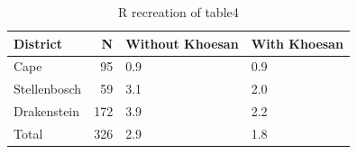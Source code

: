 \begin{table}

\caption{R recreation of table4}
\centering
\begin{tabular}[t]{lrll}
\toprule
District & N & Without Khoesan & With Khoesan\\
\midrule
Cape & 95 & 0.9 & 0.9\\
Stellenbosch & 59 & 3.1 & 2.0\\
Drakenstein & 172 & 3.9 & 2.2\\
Total & 326 & 2.9 & 1.8\\
\bottomrule
\end{tabular}
\end{table}
